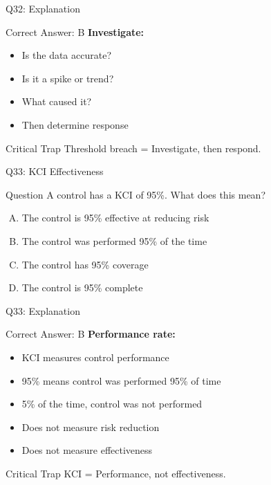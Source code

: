 \documentclass{beamer}
\begin{document}
			\begin{frame}{Q32: Explanation}
				\begin{block}{Correct Answer: B}
					\textbf{Investigate:}
					\begin{itemize}
						\item Is the data accurate?
						\item Is it a spike or trend?
						\item What caused it?
						\item Then determine response
					\end{itemize}
				\end{block}
				\begin{alertblock}{Critical Trap}
					Threshold breach = Investigate, then respond.
				\end{alertblock}
			\end{frame}
			
			\begin{frame}{Q33: KCI Effectiveness}
				\begin{block}{Question}
					A control has a KCI of 95\%. What does this mean?
				\end{block}
				\begin{enumerate}[(A)]
					\item The control is 95\% effective at reducing risk
					\item The control was performed 95\% of the time
					\item The control has 95\% coverage
					\item The control is 95\% complete
				\end{enumerate}
			\end{frame}
			
			\begin{frame}{Q33: Explanation}
				\begin{block}{Correct Answer: B}
					\textbf{Performance rate:}
					\begin{itemize}
						\item KCI measures control performance
						\item 95\% means control was performed 95\% of time
						\item 5\% of the time, control was not performed
						\item Does not measure risk reduction
						\item Does not measure effectiveness
					\end{itemize}
				\end{block}
				\begin{alertblock}{Critical Trap}
					KCI = Performance, not effectiveness.
				\end{alertblock}
			\end{frame}
			
\end{document}

